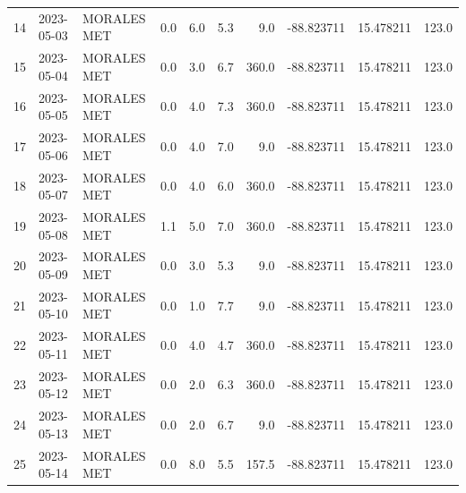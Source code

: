 \documentclass[12pt]{article}
\begin{document}
\begin{center}
\begin{tabular}{lllrrrrrrr}
14  & 2023-05-03 &  MORALES MET &     0.0 &  6.0 &         5.3 &         9.0 & -88.823711 &  15.478211 &    123.0 \\
15  & 2023-05-04 &  MORALES MET &     0.0 &  3.0 &         6.7 &       360.0 & -88.823711 &  15.478211 &    123.0 \\
16  & 2023-05-05 &  MORALES MET &     0.0 &  4.0 &         7.3 &       360.0 & -88.823711 &  15.478211 &    123.0 \\
17  & 2023-05-06 &  MORALES MET &     0.0 &  4.0 &         7.0 &         9.0 & -88.823711 &  15.478211 &    123.0 \\
18  & 2023-05-07 &  MORALES MET &     0.0 &  4.0 &         6.0 &       360.0 & -88.823711 &  15.478211 &    123.0 \\
19  & 2023-05-08 &  MORALES MET &     1.1 &  5.0 &         7.0 &       360.0 & -88.823711 &  15.478211 &    123.0 \\
20  & 2023-05-09 &  MORALES MET &     0.0 &  3.0 &         5.3 &         9.0 & -88.823711 &  15.478211 &    123.0 \\
21  & 2023-05-10 &  MORALES MET &     0.0 &  1.0 &         7.7 &         9.0 & -88.823711 &  15.478211 &    123.0 \\
22  & 2023-05-11 &  MORALES MET &     0.0 &  4.0 &         4.7 &       360.0 & -88.823711 &  15.478211 &    123.0 \\
23  & 2023-05-12 &  MORALES MET &     0.0 &  2.0 &         6.3 &       360.0 & -88.823711 &  15.478211 &    123.0 \\
24  & 2023-05-13 &  MORALES MET &     0.0 &  2.0 &         6.7 &         9.0 & -88.823711 &  15.478211 &    123.0 \\
25  & 2023-05-14 &  MORALES MET &     0.0 &  8.0 &         5.5 &       157.5 & -88.823711 &  15.478211 &    123.0 \\
\bottomrule
\end{tabular}

        
        \end{center}
        
\end{document}
